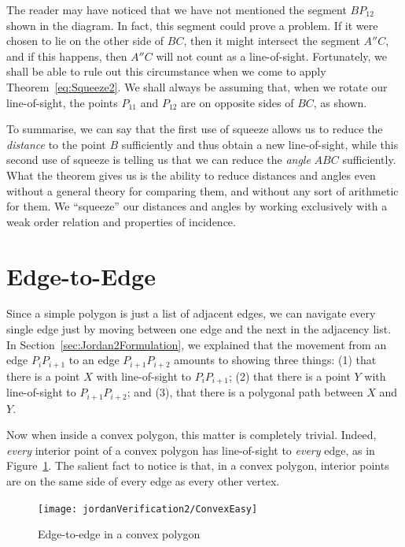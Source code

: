 The reader may have noticed that we have not mentioned the segment $BP_{12}$ shown in the diagram. In fact, this segment could prove a problem. If it were chosen to lie on the other side of $BC$, then it might intersect the segment $A''C$, and if this happens, then $A''C$ will not count as a line-of-sight. Fortunately, we shall be able to rule out this circumstance when we come to apply Theorem~\ref{eq:Squeeze2}. We shall always be assuming that, when we rotate our line-of-sight, the points $P_{11}$ and $P_{12}$ are on opposite sides of $BC$, as shown.

To summarise, we can say that the first use of squeeze allows us to reduce the \emph{distance} to the point $B$ sufficiently and thus obtain a new line-of-sight, while this second use of squeeze is telling us that we can reduce the \emph{angle} $ABC$ sufficiently. What the theorem gives us is the ability to reduce distances and angles even without a general theory for comparing them, and without any sort of arithmetic for them. We ``squeeze'' our distances and angles by working exclusively with a weak order relation and properties of incidence.

\section{Edge-to-Edge}\label{sec:NavigationVerification}
Since a simple polygon is just a list of adjacent edges, we can navigate every single edge just by moving between one edge and the next in the adjacency list. In Section~\ref{sec:Jordan2Formulation}, we explained that the movement from an edge $P_{i}P_{i+1}$ to an edge $P_{i+1}P_{i+2}$ amounts to showing three things: (1) that there is a point $X$ with line-of-sight to $P_{i}P_{i+1}$; (2) that there is a point $Y$ with line-of-sight to $P_{i+1}P_{i+2}$; and (3), that there is a polygonal path between $X$ and $Y$.

Now when inside a convex polygon, this matter is completely trivial. Indeed, \emph{every} interior point of a convex polygon has line-of-sight to \emph{every} edge, as in Figure~\ref{fig:ConvexEasy}. The salient fact to notice is that, in a convex polygon, interior points are on the same side of every edge as every other vertex. 

\begin{figure}
\centering\texttt{[image: jordanVerification2/ConvexEasy]}
\caption{Edge-to-edge in a convex polygon}
\label{fig:ConvexEasy}
\end{figure}

